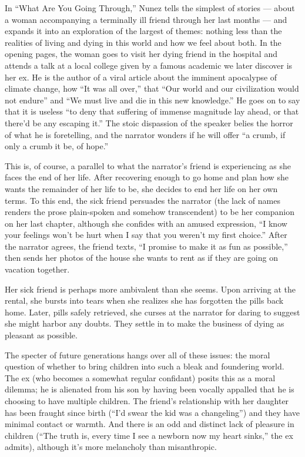 In ``What Are You Going Through,'' Nunez tells the simplest of stories
--- about a woman accompanying a terminally ill friend through her last
months --- and expands it into an exploration of the largest of themes:
nothing less than the realities of living and dying in this world and
how we feel about both. In the opening pages, the woman goes to visit
her dying friend in the hospital and attends a talk at a local college
given by a famous academic we later discover is her ex. He is the author
of a viral article about the imminent apocalypse of climate change, how
``It was all over,'' that ``Our world and our civilization would not
endure'' and ``We must live and die in this new knowledge.'' He goes on
to say that it is useless ``to deny that suffering of immense magnitude
lay ahead, or that there'd be any escaping it.'' The stoic dispassion of
the speaker belies the horror of what he is foretelling, and the
narrator wonders if he will offer ``a crumb, if only a crumb it be, of
hope.''

This is, of course, a parallel to what the narrator's friend is
experiencing as she faces the end of her life. After recovering enough
to go home and plan how she wants the remainder of her life to be, she
decides to end her life on her own terms. To this end, the sick friend
persuades the narrator (the lack of names renders the prose plain-spoken
and somehow transcendent) to be her companion on her last chapter,
although she confides with an amused expression, ``I know your feelings
won't be hurt when I say that you weren't my first choice.'' After the
narrator agrees, the friend texts, ``I promise to make it as fun as
possible,'' then sends her photos of the house she wants to rent as if
they are going on vacation together.

Her sick friend is perhaps more ambivalent than she seems. Upon arriving
at the rental, she bursts into tears when she realizes she has forgotten
the pills back home. Later, pills safely retrieved, she curses at the
narrator for daring to suggest she might harbor any doubts. They settle
in to make the business of dying as pleasant as possible.

The specter of future generations hangs over all of these issues: the
moral question of whether to bring children into such a bleak and
foundering world. The ex (who becomes a somewhat regular confidant)
posits this as a moral dilemma; he is alienated from his son by having
been vocally appalled that he is choosing to have multiple children. The
friend's relationship with her daughter has been fraught since birth
(``I'd swear the kid was a changeling'') and they have minimal contact
or warmth. And there is an odd and distinct lack of pleasure in children
(``The truth is, every time I see a newborn now my heart sinks,'' the ex
admits), although it's more melancholy than misanthropic.


